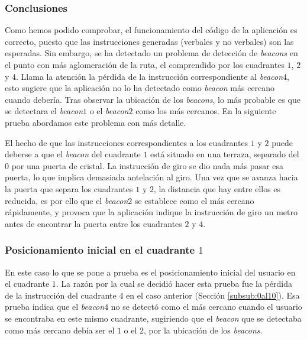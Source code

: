 \subsubsection*{Conclusiones}

Como hemos podido comprobar, el funcionamiento del código de la aplicación es correcto, puesto que las instrucciones generadas (verbales y no verbales) son las esperadas. Sin embargo, se ha detectado un problema de detección de \textit{beacons} en el punto con más aglomeración de la ruta, el comprendido por los cuadrantes $1$, $2$ y $4$. Llama la atención la pérdida de la instrucción correspondiente al \textit{beacon$4$}, esto sugiere que la aplicación no lo ha detectado como \textit{beacon} más cercano cuando debería. Tras observar la ubicación de los \textit{beacons}, lo más probable es que se detectara el \textit{beacon$1$} o el \textit{beacon$2$} como los más cercanos. En la siguiente prueba abordamos este problema con más detalle. 

El hecho de que las instrucciones correspondientes a los cuadrantes $1$ y $2$ puede deberse a que el \textit{beacon} del cuadrante $1$ está situado en una terraza, separado del $0$ por una puerta de cristal. La instrucción de giro se dio nada más pasar esa puerta, lo que implica demasiada antelación al giro. Una vez que se avanza hacia la puerta que separa los cuadrantes $1$ y $2$, la distancia que hay entre ellos es reducida, es por ello que el \textit{beacon$2$} se establece como el más cercano rápidamente, y provoca que la aplicación indique la instrucción de giro un metro antes de encontrar la puerta entre los cuadrantes $2$ y $4$.


\subsubsection{Posicionamiento inicial en el cuadrante $1$}
\label{subsub:pos1}

En este caso lo que se pone a prueba es el posicionamiento inicial del usuario en el cuadrante $1$. La razón por la cual se decidió hacer esta prueba fue la pérdida de la instrucción del cuadrante $4$ en el caso anterior (Sección \ref{subsub:0al10}). Esa prueba indica que el \textit{beacon$4$} no se detectó como el más cercano cuando el usuario se encontraba en este mismo cuadrante, sugiriendo que el \textit{beacon} que se detectaba como más cercano debía ser el $1$ o el $2$, por la ubicación de los \textit{beacons}. 


